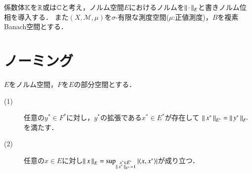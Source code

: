 	係数体$\mathbb{K}$を$\mathbb{R}$或は$\mathbb{C}$と考え，ノルム空間$E$におけるノルムを$\left\|\, \cdot\, \right\|_{E}$と書きノルム位相を導入する．
	また$(X,\mathcal{M},\mu)$を$\sigma$-有限な測度空間($\mu$:正値測度)，$B$を複素Banach空間とする．

\section{ノーミング}
	\begin{screen}
		\begin{thm}
			$E$をノルム空間，$F$を$E$の部分空間とする．
			\begin{description}
				\item[(1)]
					任意の$y^* \in F^*$に対し，$y^*$の拡張である$x^* \in E^*$が存在して
					$\left\|\, x^*\, \right\|_{E^*} = \left\|\, y^*\, \right\|_{F^*}$を満たす．
				
				\item[(2)]
					任意の$x \in E$に対し$\Norm{x}{E} = \sup{\substack{x^* \in E^* \\ \Norm{x^*}{E^*} = 1}}{\left| \inprod<x,x^*> \right|}$が成り立つ．
			\end{description}
			\label{cor:hahn_banach_extension}
		\end{thm}
	\end{screen}
	
